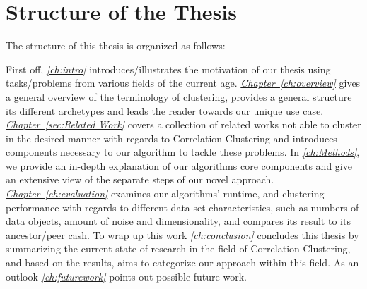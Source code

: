 \section{Structure of the Thesis}
The structure of this thesis is organized as follows:

First off, \textit{\autoref{ch:intro}} introduces/illustrates the motivation of our thesis using tasks/problems from various fields of the current age.
\textit{\hyperref[ch:overview]{Chapter~\ref*{ch:overview}}} gives a general overview of the terminology of clustering, provides a general structure its different archetypes and leads the reader towards our unique use case.
\textit{\hyperref[sec:Related Work]{Chapter~\ref*{sec:Related Work}}} covers a collection of related works not able to cluster in the desired manner with regards to Correlation Clustering and introduces components necessary to our algorithm to tackle these problems.
In \textit{\autoref{ch:Methods}}, we provide an in-depth explanation of our algorithms core components and give an extensive view of the separate steps of our novel approach.
\textit{\hyperref[ch:evaluation]{Chapter~\ref*{ch:evaluation}}} examines our algorithms' runtime, and clustering performance with regards to different data set characteristics, such as numbers of data objects, amount of noise and dimensionality, and compares its result to its ancestor/peer \acrshort{cash}.
To wrap up this work \textit{\autoref{ch:conclusion}} concludes this thesis by summarizing the current state of research in the field of Correlation Clustering, and based on the results, aims to categorize our approach within this field. As an outlook \textit{\autoref{ch:futurework}} points out possible future work.


